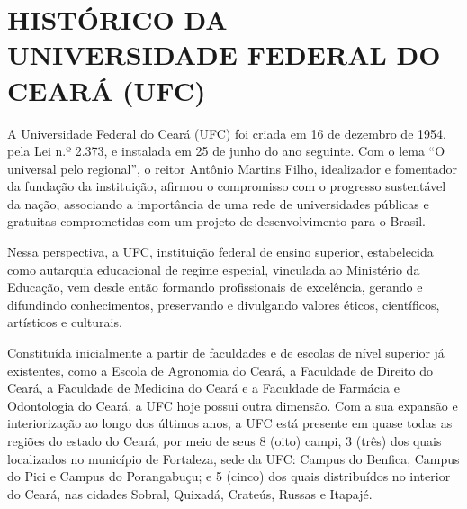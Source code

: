 \chapter{HISTÓRICO DA UNIVERSIDADE FEDERAL DO CEARÁ (UFC)}
\label{cap:historico-da-ufc}

\def\ufcAnoReferencia{2024\xspace}

\def\ufcCurGraduacao{118\xspace}
\def\ufcCurGradPresencial{110\xspace}
\def\ufcCurGradEAD{8\xspace}
\def\ufcCurEspecializacao{9\xspace}
\def\ufcCurMestrado{85\xspace}
\def\ufcCurDoutorado{56\xspace}
\def\ufcResidMedica{53\xspace}

\def\ufcVagasGrad{6.278\xspace}

\def\ufcPolosEAD{17\xspace}
\def\ufcMatriculasEAD{412\xspace}

\def\ufcDiscentesPos{8.338\xspace}

\def\ufcCartaPatente{22\xspace}
\def\ufcPedidoPatente{45\xspace}
\def\ufcRegSoftware{9\xspace}
\def\ufcPesqCNPQ{336\xspace}
\def\ufcAcoesExtensao{1.148\xspace}


A Universidade Federal do Ceará (UFC) foi criada em 16 de dezembro de 1954, pela Lei n.º 2.373, e instalada em 25 de junho do ano seguinte. Com
o lema ``O universal pelo regional'', o reitor Antônio Martins Filho, idealizador e fomentador da fundação da instituição, afirmou o compromisso com o progresso sustentável da nação, associando a importância de uma rede de universidades públicas e gratuitas comprometidas com um projeto de desenvolvimento para o Brasil.

Nessa perspectiva, a UFC, instituição federal de ensino superior, estabelecida como autarquia educacional de regime especial, vinculada ao Ministério da Educação, vem desde então formando profissionais de excelência, gerando e difundindo conhecimentos, preservando e divulgando valores éticos, científicos, artísticos e culturais.%

Constituída inicialmente a partir de faculdades e de escolas de nível superior já existentes, como a Escola de Agronomia do Ceará, a Faculdade de Direito do Ceará, a Faculdade de Medicina do Ceará e a Faculdade de Farmácia e Odontologia do Ceará, a UFC hoje possui outra dimensão. Com a sua expansão e interiorização ao longo dos últimos anos, a UFC está presente em quase todas as regiões do estado do Ceará, por meio de seus 8 (oito) campi, 3 (três) dos quais localizados no município de Fortaleza, sede da UFC: Campus do Benfica, Campus do Pici e Campus do Porangabuçu; e 5 (cinco) dos quais distribuídos no interior do Ceará, nas cidades Sobral, Quixadá, Crateús, Russas e Itapajé.

